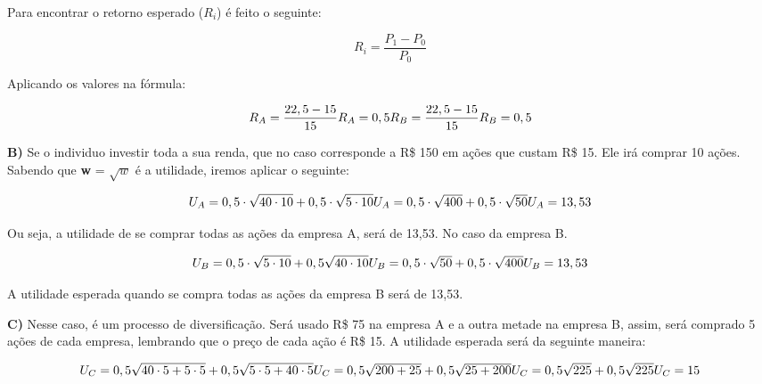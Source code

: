 Para encontrar o retorno esperado ($R_{i}$) é feito o seguinte:

\begin{equation}
	R_{i} = \dfrac{P_{1} - P_{0}}{P_{0}}
\end{equation}

Aplicando os valores na fórmula:

\begin{equation}
	R_{A} = \dfrac{22,5 - 15}{15}
	$$\\$$
	R_{A} = 0,5
	$$\\$$
	R_{B} = \dfrac{22,5 - 15}{15}
	$$\\$$ 
	R_{B} = 0,5
\end{equation}

\singlespacing

\textbf{B)} Se o individuo investir toda a sua renda, que no caso corresponde a R\$ 150 em ações que custam R\$ 15. Ele irá comprar 10 ações. Sabendo que \textbf{w} = $\sqrt{w}$ é a utilidade, iremos aplicar o seguinte:

\begin{equation}
	U_{A} = 0,5 \cdot \sqrt{40 \cdot 10} + 0,5 \cdot \sqrt{{5 \cdot 10}}
	$$\\$$
	U_{A} = 0,5 \cdot \sqrt{400} + 0,5\cdot\sqrt{50} 
	$$\\$$
	U_{A} = 13,53
\end{equation}

Ou seja, a utilidade de se comprar todas as ações da empresa A, será de 13,53. No caso da empresa B.

\begin{equation}
	U_{B} = 0,5 \cdot \sqrt{5 \cdot 10} + 0,5 \sqrt{40 \cdot 10}
	$$\\$$
	U_{B} = 0,5 \cdot \sqrt{50} + 0,5 \cdot \sqrt{400}
	$$\\$$
	U_{B} = 13,53
\end{equation}

A utilidade esperada quando se compra todas as ações da empresa B será de 13,53.

\singlespacing


\textbf{C)} Nesse caso, é um processo de diversificação. Será usado R\$ 75 na empresa A e a outra metade na empresa B, assim, será comprado 5 ações de cada empresa, lembrando que o preço de cada ação é R\$ 15. A utilidade esperada será da seguinte maneira:

\begin{equation}
	U_{C} = 0,5 \sqrt{40 \cdot 5 + 5 \cdot 5} + 0,5 \sqrt{5 \cdot 5 + 40 \cdot 5 }
	$$\\$$
	U_{C} = 0,5 \sqrt{200 + 25} + 0,5 \sqrt{25 + 200}
	$$\\$$
	U_{C} = 0,5 \sqrt{225} + 0,5 \sqrt{225}
	$$\\$$
	U_{C} = 15
\end{equation}

